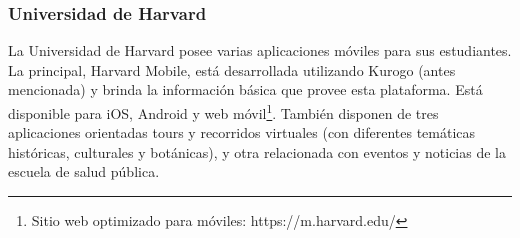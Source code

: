 \subsubsection{Universidad de Harvard}
\label{aplicaciones_existentes_harvard}
La Universidad de Harvard posee varias aplicaciones móviles para sus estudiantes. 
La principal, Harvard Mobile, está desarrollada utilizando Kurogo (antes
mencionada) y brinda la información básica que provee esta plataforma. Está
disponible para iOS, Android y web móvil\footnote{Sitio web optimizado para
móviles: https://m.harvard.edu/}.
También disponen de tres aplicaciones orientadas tours y recorridos virtuales
(con diferentes temáticas históricas, culturales y botánicas), y otra
relacionada con eventos y noticias de la escuela de salud pública.
